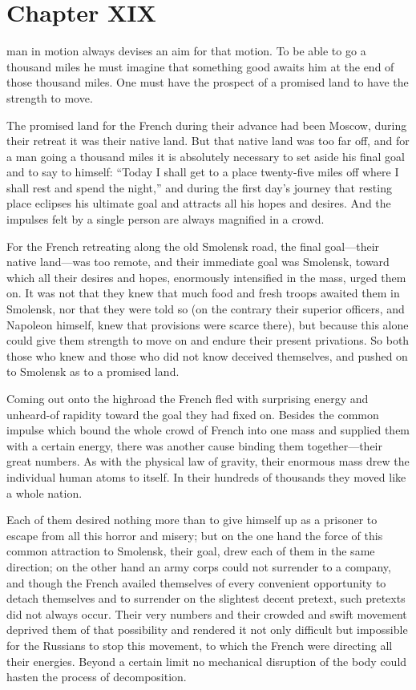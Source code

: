 \chapter*{Chapter XIX} \ifaudio {}
\fi

man in motion always devises an aim for that motion. To be able
to go a thousand miles he must imagine that something good awaits
him at the end of those thousand miles. One must have the
prospect of a promised land to have the strength to move.

The promised land for the French during their advance had been
Moscow, during their retreat it was their native land. But that
native land was too far off, and for a man going a thousand miles
it is absolutely necessary to set aside his final goal and to say
to himself: ``Today I shall get to a place twenty-five miles off
where I shall rest and spend the night,'' and during the first
day's journey that resting place eclipses his ultimate goal and
attracts all his hopes and desires. And the impulses felt by a
single person are always magnified in a crowd.

For the French retreating along the old Smolensk road, the final
goal---their native land---was too remote, and their immediate
goal was Smolensk, toward which all their desires and hopes,
enormously intensified in the mass, urged them on. It was not
that they knew that much food and fresh troops awaited them in
Smolensk, nor that they were told so (on the contrary their
superior officers, and Napoleon himself, knew that provisions
were scarce there), but because this alone could give them
strength to move on and endure their present privations. So both
those who knew and those who did not know deceived themselves,
and pushed on to Smolensk as to a promised land.

Coming out onto the highroad the French fled with surprising
energy and unheard-of rapidity toward the goal they had fixed
on. Besides the common impulse which bound the whole crowd of
French into one mass and supplied them with a certain energy,
there was another cause binding them together---their great
numbers. As with the physical law of gravity, their enormous mass
drew the individual human atoms to itself. In their hundreds of
thousands they moved like a whole nation.

Each of them desired nothing more than to give himself up as a
prisoner to escape from all this horror and misery; but on the
one hand the force of this common attraction to Smolensk, their
goal, drew each of them in the same direction; on the other hand
an army corps could not surrender to a company, and though the
French availed themselves of every convenient opportunity to
detach themselves and to surrender on the slightest decent
pretext, such pretexts did not always occur. Their very numbers
and their crowded and swift movement deprived them of that
possibility and rendered it not only difficult but impossible for
the Russians to stop this movement, to which the French were
directing all their energies. Beyond a certain limit no
mechanical disruption of the body could hasten the process of
decomposition.

